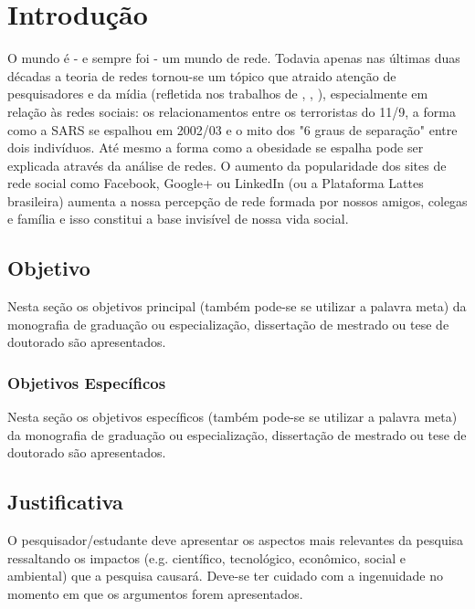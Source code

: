 \chapter{Introdução}
\label{chap:intro}

O mundo \'e - e sempre foi - um mundo de rede. Todavia apenas nas \'ultimas duas d\'ecadas a teoria de redes tornou-se um t\'opico que atraido aten\c{c}\~ao de pesquisadores e da m\'idia (refletida nos trabalhos de \cite{Barabasi2003-1}, \cite{Watts2003}, \cite{NBW2006}), especialmente em rela\c{c}\~ao \`as redes sociais: os relacionamentos entre os terroristas do 11/9, a forma como a SARS se espalhou em 2002/03 e o mito dos "6 graus de separa\c{c}\~ao" entre dois indiv\'iduos. At\'e mesmo a forma como a obesidade se espalha pode ser explicada atrav\'es da an\'alise de redes. O aumento da popularidade dos sites de rede social como Facebook, Google+ ou LinkedIn (ou a Plataforma Lattes brasileira) aumenta a nossa percep\c{c}\~ao de rede formada por nossos amigos, colegas e fam\'ilia e isso constitui a base invis\'ivel de nossa vida social.

\section{Objetivo}
\label{sec:obj}

Nesta se\c{c}\~ao os objetivos principal (tamb\'em
pode-se se utilizar a palavra meta) da monografia de
gradua\c{c}\~ao ou especializa\c{c}\~ao, disserta\c{c}\~ao de
mestrado ou tese de doutorado s\~ao apresentados.


\subsection{Objetivos Específicos}
\label{ssec:objesp}

Nesta se\c{c}\~ao os objetivos espec\'ificos (tamb\'em
pode-se se utilizar a palavra meta) da monografia de
gradua\c{c}\~ao ou especializa\c{c}\~ao, disserta\c{c}\~ao de
mestrado ou tese de doutorado s\~ao apresentados.

\section{Justificativa}
\label{sec:justi}

O pesquisador/estudante deve apresentar os aspectos mais
relevantes da pesquisa ressaltando os impactos (e.g. cient\'ifico,
tecnol\'ogico, econ\^omico, social e ambiental) que a pesquisa
causar\'a. Deve-se ter cuidado com a ingenuidade no momento em que
os argumentos forem apresentados.


